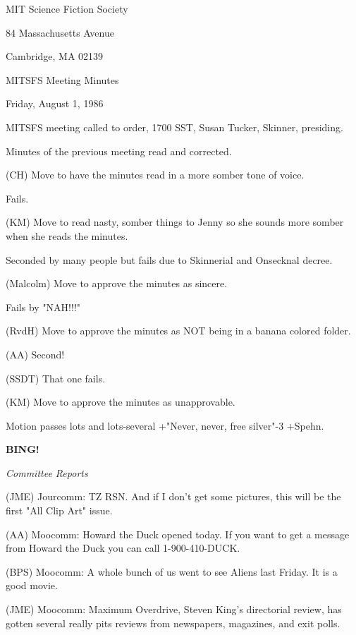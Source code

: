 \documentclass[12pt]{article}
\newcommand{\bing}{{\bf BING!} }
\newcommand{\goto}[1]{\bing \vskip 12pt \centerline{{\em{#1}}}}
\begin{document}
\begin{center}

MIT Science Fiction Society 

84 Massachusetts Avenue

Cambridge, MA 02139

\vspace{12pt}

MITSFS Meeting Minutes 

Friday, August 1, 1986

\end{center}
 
\vspace{18pt}

\setlength{\parskip}{6pt}

\noindent
MITSFS meeting called to order, 1700 SST,
Susan Tucker, Skinner, presiding.

Minutes of the previous meeting read and corrected.

(CH) Move to have the minutes read in a more somber tone of voice.

Fails.

(KM) Move to read nasty, somber things to Jenny so she sounds more somber when she reads the minutes.

Seconded by many people but fails due to Skinnerial and Onsecknal decree.

(Malcolm) Move to approve the minutes as sincere.

Fails by "NAH!!!"

(RvdH) Move to approve the minutes as NOT being in a banana colored folder.

(AA) Second!

(SSDT) That one fails.

(KM) Move to approve the minutes as unapprovable.

Motion passes lots and lots-several +"Never, never, free silver"-3 +Spehn.

\goto{Committee Reports}

(JME) Jourcomm: TZ RSN. And if I don't get some pictures, this will be the first "All Clip Art" issue.

(AA) Moocomm: Howard the Duck opened today. If you want to get a message from Howard the Duck you can call 1-900-410-DUCK.

(BPS) Moocomm: A whole bunch of us went to see Aliens last Friday. It is a good movie.

(JME) Moocomm: Maximum Overdrive, Steven King's directorial review, has gotten several really pits reviews from newspapers, magazines, and exit polls.
\end{document}
